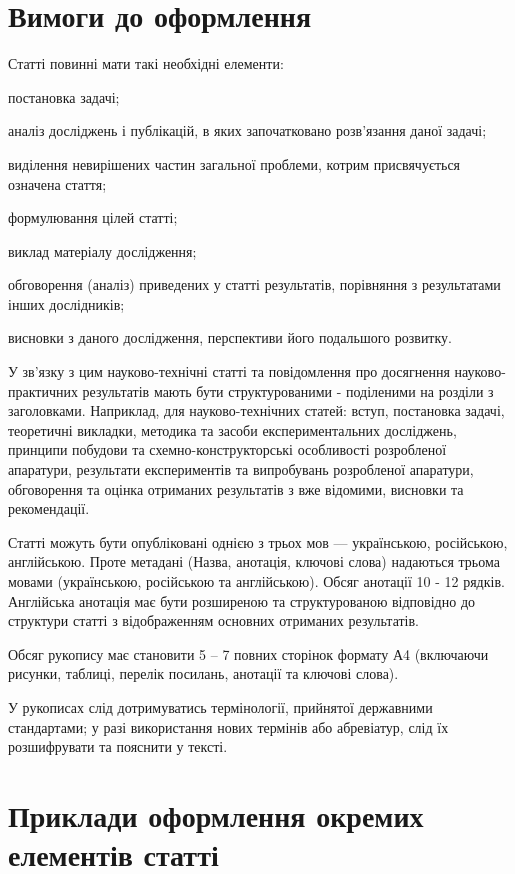 \section{Вимоги до оформлення}

Статті повинні мати такі необхідні елементи: 
\begin{list}{-}{}
	\item постановка задачі; 
	\item аналіз досліджень і публікацій, в яких започатковано розв'язання даної задачі; 
	\item виділення невирішених частин загальної проблеми, котрим присвячується означена стаття; 
	\item формулювання цілей статті; 
	\item виклад матеріалу дослідження; 
	\item обговорення (аналіз) приведених у статті результатів, порівняння з результатами інших дослідників; 
	\item висновки з даного дослідження, перспективи його подальшого розвитку.
\end{list}

У зв'язку з цим науково-технічні статті та повідомлення про досягнення науково-практичних результатів мають бути структурованими - поділеними на розділи з заголовками. Наприклад, для науково-технічних статей: вступ, постановка задачі, теоретичні викладки, методика та засоби експериментальних досліджень, принципи побудови та схемно-конструкторські особливості розробленої апаратури, результати експериментів та випробувань розробленої апаратури, обговорення та оцінка отриманих результатів з вже відомими, висновки та рекомендації.

Статті можуть бути опубліковані однією  з трьох мов --- українською, російською, англійською. Проте метадані (Назва, анотація, ключові слова) надаються трьома мовами (українською, російською та англійською). Обсяг анотації 10 - 12 рядків. Англійська анотація має бути розширеною та структурованою відповідно до структури статті з відображенням основних отриманих результатів.

Обсяг рукопису має становити 5 -- 7 повних сторінок формату А4 (включаючи рисунки, таблиці, перелік посилань, анотації та ключові слова).

У рукописах слід дотримуватись термінології, прийнятої державними стандартами; у разі використання нових термінів або абревіатур, слід їх розшифрувати та пояснити у тексті.



\section{Приклади оформлення окремих елементів статті}


